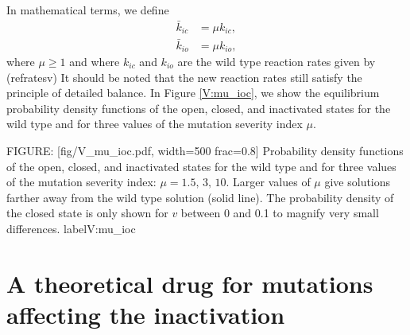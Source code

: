 In mathematical terms, we define
\begin{align}
\bar{k}_{ic} &  =\mu k_{ic},\label{ratesvm}\\
\bar{k}_{io} &  =\mu k_{io}, \nonumber
\end{align}
where $\mu\geqslant1$ and where $k_{ic}$ and $k_{io}$ are the wild type
reaction rates given by (ref{ratesv}) It should be noted that the
new reaction rates still satisfy the principle of detailed balance. 
In Figure \ref{V:mu_ioc}, we show the equilibrium
probability density functions of the open, closed, and inactivated states for 
the wild type and for three values of the mutation severity index $\mu.$

FIGURE: [fig/V_mu_ioc.pdf, width=500 frac=0.8] Probability density functions of the open, closed, and 
inactivated states for the wild type and for three values of the mutation 
severity index: $\mu=1.5,\, 3,\, 10.$ Larger values of $\mu$ give
solutions farther away from the wild type solution (solid line). The probability density of the closed state is 
only shown for $v$ between 0 and 0.1 to magnify very small differences. label{V:mu_ioc}

\section[Drug for mutations of inactivation]{A theoretical drug for mutations affecting the inactivation}



